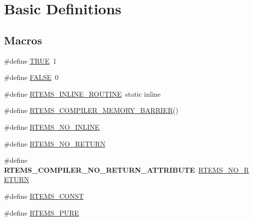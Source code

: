 \hypertarget{group__RTEMSScoreBaseDefs}{}\section{Basic Definitions}
\label{group__RTEMSScoreBaseDefs}
\subsection*{Macros}
\begin{DoxyCompactItemize}
\item 
\#define \mbox{\hyperlink{group__RTEMSScoreBaseDefs_gaa8cecfc5c5c054d2875c03e77b7be15d}{T\+R\+UE}}~1
\item 
\#define \mbox{\hyperlink{group__RTEMSScoreBaseDefs_gaa93f0eb578d23995850d61f7d61c55c1}{F\+A\+L\+SE}}~0
\item 
\#define \mbox{\hyperlink{group__RTEMSScoreBaseDefs_gac216239df231d5dbd15e3520b0b9313f}{R\+T\+E\+M\+S\+\_\+\+I\+N\+L\+I\+N\+E\+\_\+\+R\+O\+U\+T\+I\+NE}}~static inline
\item 
\#define \mbox{\hyperlink{group__RTEMSScoreBaseDefs_ga81cf73d35183e14fe3e08dffb62ec579}{R\+T\+E\+M\+S\+\_\+\+C\+O\+M\+P\+I\+L\+E\+R\+\_\+\+M\+E\+M\+O\+R\+Y\+\_\+\+B\+A\+R\+R\+I\+ER}}()
\item 
\#define \mbox{\hyperlink{group__RTEMSScoreBaseDefs_gae7e4f8ea7e3b299c78561f1102122ff4}{R\+T\+E\+M\+S\+\_\+\+N\+O\+\_\+\+I\+N\+L\+I\+NE}}
\item 
\#define \mbox{\hyperlink{group__RTEMSScoreBaseDefs_gaa2f0ed67aa174f684bb31b7e8bdb386f}{R\+T\+E\+M\+S\+\_\+\+N\+O\+\_\+\+R\+E\+T\+U\+RN}}
\item 
\mbox{\label{group__RTEMSScoreBaseDefs_ga0a43e00266b697731245f1e1fda6cd61}} 
\#define {\bfseries R\+T\+E\+M\+S\+\_\+\+C\+O\+M\+P\+I\+L\+E\+R\+\_\+\+N\+O\+\_\+\+R\+E\+T\+U\+R\+N\+\_\+\+A\+T\+T\+R\+I\+B\+U\+TE}~\mbox{\hyperlink{group__RTEMSScoreBaseDefs_gaa2f0ed67aa174f684bb31b7e8bdb386f}{R\+T\+E\+M\+S\+\_\+\+N\+O\+\_\+\+R\+E\+T\+U\+RN}}
\item 
\#define \mbox{\hyperlink{group__RTEMSScoreBaseDefs_gaa39ed3eb64c49d564b9c6a4700c872f8}{R\+T\+E\+M\+S\+\_\+\+C\+O\+N\+ST}}
\item 
\#define \mbox{\hyperlink{group__RTEMSScoreBaseDefs_gaec99cd3de9d6cdbc517b1af5bf64556b}{R\+T\+E\+M\+S\+\_\+\+P\+U\+RE}}
\item 
\mbox{\label{group__RTEMSScoreBaseDefs_gafee4a77e1b19808753974c5b0e8b0dbe}} 

\end{DoxyCompactItemize}
